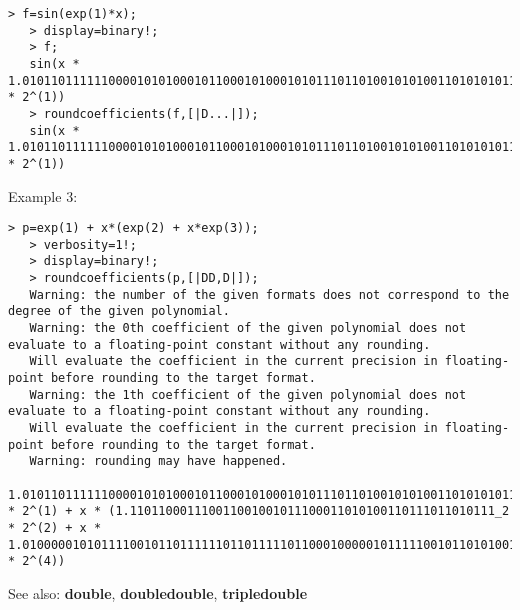 \begin{center}\begin{minipage}{14.8cm}\begin{Verbatim}[frame=single]
   > f=sin(exp(1)*x);
   > display=binary!;
   > f;
   sin(x * 1.0101101111110000101010001011000101000101011101101001010100110101010111111011100010101100010000000100111001111010011110011110001110110001011100111000101100000111101_2 * 2^(1))
   > roundcoefficients(f,[|D...|]);
   sin(x * 1.0101101111110000101010001011000101000101011101101001010100110101010111111011100010101100010000000100111001111010011110011110001110110001011100111000101100000111101_2 * 2^(1))
\end{Verbatim}
\end{minipage}\end{center}
\noindent Example 3: 
\begin{center}\begin{minipage}{14.8cm}\begin{Verbatim}[frame=single]
   > p=exp(1) + x*(exp(2) + x*exp(3));
   > verbosity=1!;
   > display=binary!;
   > roundcoefficients(p,[|DD,D|]);
   Warning: the number of the given formats does not correspond to the degree of the given polynomial.
   Warning: the 0th coefficient of the given polynomial does not evaluate to a floating-point constant without any rounding.
   Will evaluate the coefficient in the current precision in floating-point before rounding to the target format.
   Warning: the 1th coefficient of the given polynomial does not evaluate to a floating-point constant without any rounding.
   Will evaluate the coefficient in the current precision in floating-point before rounding to the target format.
   Warning: rounding may have happened.
   1.010110111111000010101000101100010100010101110110100101010011010101011111101110001010110001000000010011101_2 * 2^(1) + x * (1.110110001110011001001011100011010100110111011010111_2 * 2^(2) + x * 1.01000001010111100101101111110110111110110001000001011111001011010100101111011111110001010011011101000100110000111010001110010000010110000101100000111001011100101001_2 * 2^(4))
\end{Verbatim}
\end{minipage}\end{center}
See also: \textbf{double}, \textbf{doubledouble}, \textbf{tripledouble}
